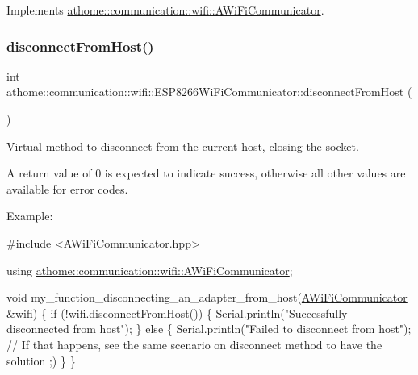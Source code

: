 Implements \mbox{\hyperlink{classathome_1_1communication_1_1wifi_1_1_a_wi_fi_communicator_a6131240ac0daa0f9fb4d46871feea4c2}{athome\+::communication\+::wifi\+::\+A\+Wi\+Fi\+Communicator}}.

\mbox{\label{classathome_1_1communication_1_1wifi_1_1_e_s_p8266_wi_fi_communicator_a0f8adbe1b1d219148c4f340980056356}} 
\subsubsection{\texorpdfstring{disconnect\+From\+Host()}{disconnectFromHost()}}
{\footnotesize\ttfamily int athome\+::communication\+::wifi\+::\+E\+S\+P8266\+Wi\+Fi\+Communicator\+::disconnect\+From\+Host (\begin{DoxyParamCaption}{ }\end{DoxyParamCaption})\hspace{0.3cm}{\ttfamily [virtual]}}

Virtual method to disconnect from the current host, closing the socket.

A return value of 0 is expected to indicate success, otherwise all other values are available for error codes.

Example\+:


\begin{DoxyCode}
\textcolor{preprocessor}{#include <AWiFiCommunicator.hpp>}

\textcolor{keyword}{using} \mbox{\hyperlink{classathome_1_1communication_1_1wifi_1_1_a_wi_fi_communicator}{athome::communication::wifi::AWiFiCommunicator}};

\textcolor{keywordtype}{void} my\_function\_disconnecting\_an\_adapter\_from\_host(\mbox{\hyperlink{classathome_1_1communication_1_1wifi_1_1_a_wi_fi_communicator_a0098148fe8d0eeee99b7f8f72a72a900}{AWiFiCommunicator}}
&wifi) \{ \textcolor{keywordflow}{if} (!wifi.disconnectFromHost()) \{ Serial.println(\textcolor{stringliteral}{"Successfully}
\textcolor{stringliteral}{disconnected from host"}); \} \textcolor{keywordflow}{else} \{ Serial.println(\textcolor{stringliteral}{"Failed to disconnect}
\textcolor{stringliteral}{from host"}); \textcolor{comment}{// If that happens, see the same scenario on disconnect method}
to have the solution ;)
  \}
\}
\end{DoxyCode}
 

